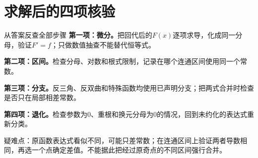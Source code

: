 \section{求解后的四项核验}\label{ic:verification}
\begin{method}{从答案反查全部步骤}
\textbf{第一项：微分。}把回代后的$F(x)$逐项求导，化成同一分母，验证$F'=f$；只做数值抽查不能替代恒等式。
\par\textbf{第二项：区间。}检查分母、对数和根式限制，记录在哪个连通区间使用同一个常数。
\par\textbf{第三项：分支。}反三角、反双曲和特殊函数均使用已声明分支；把两式合并时检查是否只在局部相差常数。
\par\textbf{第四项：退化。}检查参数为0、重根和换元分母为0的情况，回到未约化的表达式重新分类。
\end{method}
\begin{warning}疑难点：原函数表达式看似不同，可能只差常数；在连通区间上验证两者导数相同，再选一个点确定差值。不能据此把经过原奇点的不同区间强行合并。\end{warning}
